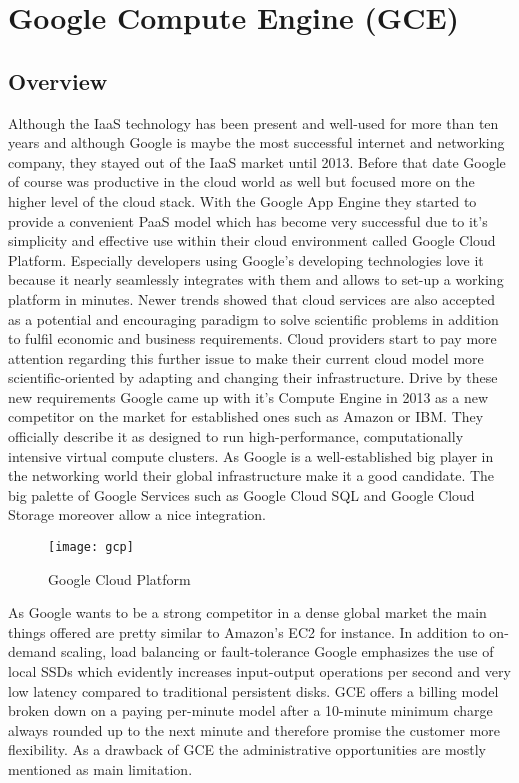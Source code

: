 \section{Google Compute Engine (GCE)}

\subsection{Overview}
Although the IaaS technology has been present and well-used for more than ten years and although Google is maybe the most successful internet and networking company, they stayed out of the IaaS market until 2013. Before that date Google of course was productive in the cloud world as well but focused more on the higher level of the cloud stack. With the Google App Engine they started to provide a convenient PaaS model which has become very successful due to it's simplicity and effective use within their cloud environment called Google Cloud Platform. Especially developers using Google's developing technologies love it because it nearly seamlessly integrates with them and allows to set-up a working platform in minutes. Newer trends showed that cloud services are also accepted as a potential and encouraging paradigm to solve scientific problems in addition to fulfil economic and business requirements. Cloud providers start to pay more attention regarding this further issue to make their current cloud model more scientific-oriented by adapting and changing their infrastructure. Drive by these new requirements Google came up with it's Compute Engine in 2013 as a new competitor on the market for established ones such as Amazon or IBM. \cite{GCE_2013} They officially describe it as designed to run high-performance, computationally intensive virtual compute clusters. As Google is a well-established big player in the networking world their global infrastructure make it a good candidate. The big palette of Google Services such as Google Cloud SQL and Google Cloud Storage moreover allow a nice integration. \cite{IaaS_2015}

\begin{figure}[h!]
	\centering
		\texttt{[image: gcp]}
	\caption{Google Cloud Platform}
\end{figure}

As Google wants to be a strong competitor in a dense global market the main things offered are pretty similar to Amazon's EC2 for instance. In addition to on-demand scaling, load balancing or fault-tolerance Google emphasizes the use of local SSDs which evidently increases input-output operations per second and very low latency compared to traditional persistent disks. GCE offers a billing model broken down on a paying per-minute model after a 10-minute minimum charge always rounded up to the next minute and therefore promise the customer more flexibility. As a drawback of GCE the administrative opportunities are mostly mentioned as main limitation. \cite{GoogleDev} 

